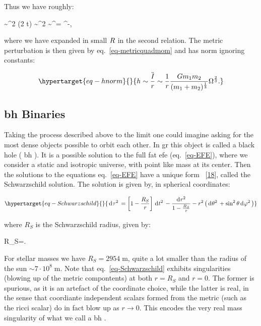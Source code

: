 \documentclass[
  10pt,
  a4paper,
  DIV=11,
  numbers=noendperiod,
  twoside]{scrreprt}
\let\[\relax \let\]\relax %
\DeclareRobustCommand{\[}{\begin{equation}}
\DeclareRobustCommand{\]}{\end{equation}}
\begin{document}
Thus we have roughly:

\[
\quadmom[]\sim \redmass \dist^2 \cos (2 \Omega  t) \sim \redmass \dist^2 \sim \redmass {}^{}= \Omega^{-},
\]

where we have expanded in small \(R\) in the second relation. The
metric perturbation is then given by eq.~\ref{eq-metricquadmom} and has
norm ignoring constants:

\begin{equation}\protect\hypertarget{eq-hnorm}{}{
h \sim \frac{\ddot{\quadmom[]}}{r} \sim \frac{1}{r} \frac{\grav\mass[1]\mass[2]}{\pa{\mass[1]+\mass[2]}^{\frac{1}{3}}}\Omega^{\frac{2}{3}}.
}\label{eq-hnorm}\end{equation}

\hypertarget{bh-binaries}{%
\subsection{\texorpdfstring{\gls{bh}
Binaries}{ Binaries}}\label{bh-binaries}}

Taking the process described above to the limit one could imagine asking
for the most dense objects possible to orbit each other. In \gls{gr}
this object is called a black hole ( \gls{bh} ). It is a possible
solution to the full fat \gls{efe} (eq.~\ref{eq-EFE}), where we consider
a static and isotropic universe, with point like mass at its center.
Then the solutions to the equations eq.~\ref{eq-EFE} have a unique form
~{[}\protect\hyperlink{ref-Birkhoff:1923}{18}{]}, called the
Schwarzschild solution. The solution is given by, in spherical
coordinates:

\begin{equation}\protect\hypertarget{eq-Schwarzschild}{}{
\dd{\tau^{2}}=\left[
    1-\frac{R_{S}}{r}
    \right]\dd{t^{2}}
-\frac{\dd{r^2}}{1-\frac{R_{S}}{r}}-r^{2}\left(\dd{ \theta^2}+\sin ^{2} \theta \dd{ \varphi^2}\right)
}\label{eq-Schwarzschild}\end{equation}

where \(R_S\) is the Schwarzschild radius, given by:

\[
R_S=.
\]

For stellar masses we have \(R_S=2954\; \mathrm{m}\), quite a lot
smaller than the radius of the sun \(\sim 7\cdot10^8\; \mathrm{m}\).
Note that eq.~\ref{eq-Schwarzschild} exhibits singularities (blowing up
of the metric compontents) at both \(r=R_S\) and \(r=0\). The former is
spurious, as it is an artefact of the coordinate choice, while the
latter is real, in the sense that coordiante independent scalars formed
from the metric (such as the ricci scalar) do in fact blow up as
\(r\to0\). This encodes the very real mass singularity of what we call a
\gls{bh} .
\end{document}
